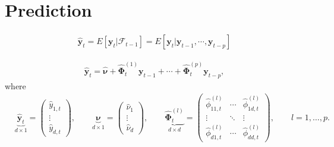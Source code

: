 \documentclass[fleqn]{article}
\begin{document}
\section{Prediction}

\begin{align*}
    \hat{\bm y}_t = E[\bm y_t| \mathcal F_{t-1}] = E[\bm y_t| \bm y_{t-1}, \cdots, \bm y_{t-p}]
\end{align*}

\begin{align*}
    \hat{\bm y}_t = \hat{\bm \nu} + \hat{\bm \Phi}^{(1)}_{t} \bm y_{t-1} + \cdots + \hat{\bm \Phi}^{(p)}_{t} \bm y_{t-p},
\end{align*}
where
\begin{align*}
    & \underbrace{\hat{\bm y}_t}_{d \times 1} = \begin{pmatrix}
        \hat{y}_{1, t} \\
        \vdots \\
        \hat{y}_{d, t}
    \end{pmatrix},
    \qquad
    \underbrace{\bm \nu}_{d \times 1} = \begin{pmatrix}
        \hat{\nu}_1 \\
        \vdots \\
        \hat{\nu}_d
    \end{pmatrix},
    \qquad
    \underbrace{\hat{\bm \Phi}^{(l)}_t}_{d \times d} = \begin{pmatrix}
        \hat{\phi}^{(l)}_{11, t} & \cdots & \hat{\phi}^{(l)}_{1d, t} \\
        \vdots & \ddots & \vdots \\
        \hat{\phi}^{(l)}_{d1, t} & \cdots & \hat{\phi}^{(l)}_{dd, t}
    \end{pmatrix},
    \qquad
    l = 1, \dots, p.
\end{align*}
\end{document}
